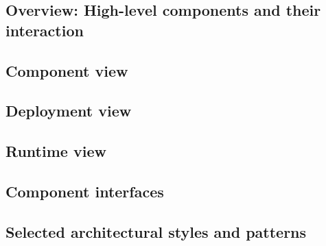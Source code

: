 \subsection{Overview: High-level components and their interaction}
\subsection{Component view}
\subsection{Deployment view}
\subsection{Runtime view}
\subsection{Component interfaces}
\subsection{Selected architectural styles and patterns}